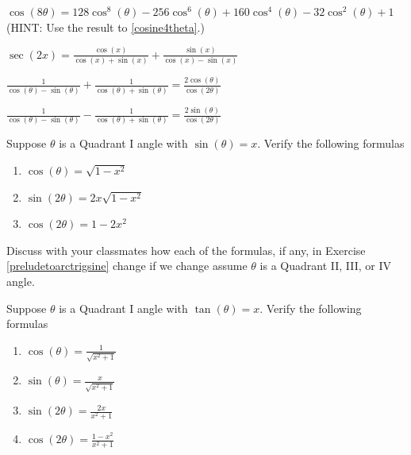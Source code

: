 \documentclass{ximera}
\begin{document}
\begin{question}
\begin{problem}
    $\cos(8\theta) = 128\cos^{8}(\theta)-256\cos^{6}(\theta)+160\cos^{4}(\theta)-32\cos^{2}(\theta)+1$ (HINT:  Use the result to \ref{cosine4theta}.)
\end{problem}

\begin{problem}
    $\sec(2x) = \frac{\cos(x)}{\cos(x) + \sin(x)} + \frac{\sin(x)}{\cos(x)-\sin(x)}$ 
\end{problem}

\begin{problem}
     $\frac{1}{\cos(\theta) - \sin(\theta)} + \frac{1}{\cos(\theta) + \sin(\theta)} = \frac{2\cos(\theta)}{\cos(2\theta)}$
\end{problem}

\begin{problem} \label{moreidentlast}
    $\frac{1}{\cos(\theta) - \sin(\theta)} - \frac{1}{\cos(\theta) + \sin(\theta)} = \frac{2\sin(\theta)}{\cos(2\theta)}$
\end{problem}


\end{question}

\begin{problem}\label{preludetoarctrigsine}
Suppose $\theta$ is a Quadrant I angle with $\sin(\theta) = x$. Verify the following formulas

\begin{enumerate}

\item  $\cos(\theta) = \sqrt{1-x^2}$

\item  $\sin(2\theta) = 2x\sqrt{1-x^2}$

\item $\cos(2\theta) = 1 - 2x^2$

\end{enumerate}
\end{problem}

\begin{problem}
Discuss with your classmates how each of the formulas, if any, in Exercise \ref{preludetoarctrigsine} change if we change assume $\theta$ is a Quadrant II, III, or IV angle.
\end{problem}

\begin{problem}\label{preludetoarctrigtan}
Suppose $\theta$ is a Quadrant I angle with $\tan(\theta) = x$. Verify the following formulas
\begin{enumerate}

\item $\cos(\theta) = \frac{1}{\sqrt{x^2+1}}$
\item $\sin(\theta) = \frac{x}{\sqrt{x^2+1}}$
\item $\sin(2\theta) = \frac{2x}{x^2+1}$
\item $\cos(2\theta) = \frac{1-x^2}{x^2+1}$

\end{enumerate}

\end{problem}
\end{document}
